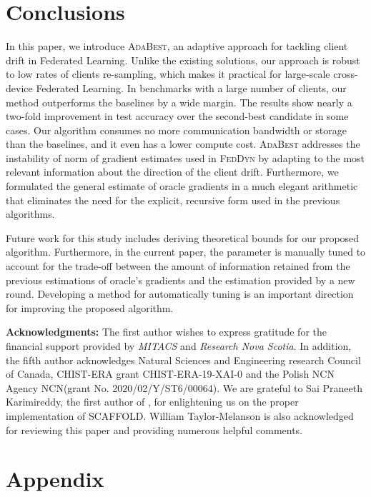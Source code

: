 \documentclass[runningheads]{llncs}
\newcommand{\scaffold}{\textsc{SCAFFOLD}\xspace}
\newcommand{\feddyn}{\textsc{FedDyn}\xspace}
\newcommand{\ours}{\textsc{AdaBest}\xspace}
\begin{document}
\label{sec:experiments}

\section{Conclusions}
In this paper, we introduce \ours, an adaptive approach for tackling client drift in Federated Learning. Unlike the existing solutions, our approach is robust to low rates of clients re-sampling, which makes it practical for large-scale cross-device Federated Learning. 
In benchmarks with a large number of clients, our method outperforms the baselines by a wide margin. 
The results show nearly a two-fold improvement in test accuracy over the second-best candidate in some cases.
Our algorithm consumes no more communication bandwidth or storage than the baselines, and it even has a lower compute cost. \ours addresses the instability of norm of gradient estimates used in \feddyn by adapting to the most relevant information about the direction of the client drift. Furthermore, we formulated the general estimate of oracle gradients in a much elegant arithmetic that eliminates the need for the explicit, recursive form used in the previous algorithms.

Future work for this study includes deriving theoretical bounds for our proposed algorithm. Furthermore, in the current paper, the parameter  is manually tuned to account for the trade-off between the amount of information retained from the previous estimations of oracle's gradients and the estimation provided by a new round. Developing a method for automatically tuning  is an important direction for improving the proposed algorithm.

\smallskip \noindent \textbf{Acknowledgments: } 
The first author wishes to express gratitude for the financial support provided by \emph{MITACS} and \emph{Research Nova Scotia}.
In addition, the fifth author acknowledges Natural Sciences and Engineering research Council of Canada, CHIST-ERA grant CHIST-ERA-19-XAI-0 and the Polish NCN Agency NCN(grant No. 2020/02/Y/ST6/00064). We are grateful to Sai Praneeth Karimireddy, the first author of \cite{karimireddy2020scaffold}, for enlightening us on the proper implementation of \scaffold. William Taylor-Melanson is also acknowledged for reviewing this paper and providing numerous helpful comments.



\clearpage



\clearpage
\section*{Appendix}
\setcounter{remark}{0}
\setcounter{theorem}{0}
\setcounter{figure}{3}
\setcounter{table}{2}
\setcounter{algorithm}{1}
\setcounter{section}{0}
\renewcommand{\thesection}{\Alph{section}}
\end{document}
